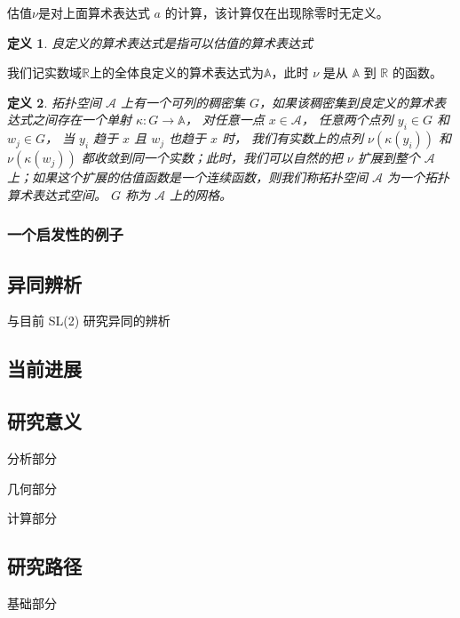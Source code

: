 \documentclass[a4paper,12pt]{article}
\numberwithin{problem}{section}
\newtheorem{definition}{定义}
\numberwithin{definition}{section}
\numberwithin{lemma}{section}
\numberwithin{proposition}{section}
\numberwithin{theorem}{section}
\numberwithin{grammar}{section}
\numberwithin{program}{section}
\numberwithin{convention}{section}
\numberwithin{corollary}{section}
\begin{document}
估值$\nu$是对上面算术表达式 $a$ 的计算，该计算仅在出现除零时无定义。

\begin{definition}
    良定义的算术表达式是指可以估值的算术表达式
\end{definition}

我们记实数域$\mathbb{R}$上的全体良定义的算术表达式为$\mathbb{A}$，此时 $\nu$ 是从 $\mathbb{A}$ 到 $\mathbb{R}$ 的函数。

\begin{definition}
    拓扑空间 $\mathcal{A}$ 上有一个可列的稠密集 $G$，如果该稠密集到良定义的算术表达式之间存在一个单射 $\kappa: G \to \mathbb{A}$，
    对任意一点 $x \in \mathcal{A}$， 任意两个点列 $y_i \in G$ 和 $w_j \in G$， 当 $y_i$ 趋于 $x$ 且 $w_j$ 也趋于 $x$ 时，
    我们有实数上的点列 $\nu(\kappa(y_i))$ 和 $\nu(\kappa(w_j))$ 都收敛到同一个实数；此时，我们可以自然的把 $\nu$ 扩展到整个
    $\mathcal{A}$ 上；如果这个扩展的估值函数是一个连续函数，则我们称拓扑空间 $\mathcal{A}$ 为一个拓扑算术表达式空间。 $G$ 称为
    $\mathcal{A}$ 上的网格。
\end{definition}

\subsubsection{一个启发性的例子}




\subsection{异同辨析}

与目前 SL(2) 研究异同的辨析

\subsection{当前进展}

\subsection{研究意义}

分析部分

几何部分

计算部分

\subsection{研究路径}

基础部分
\end{document}

